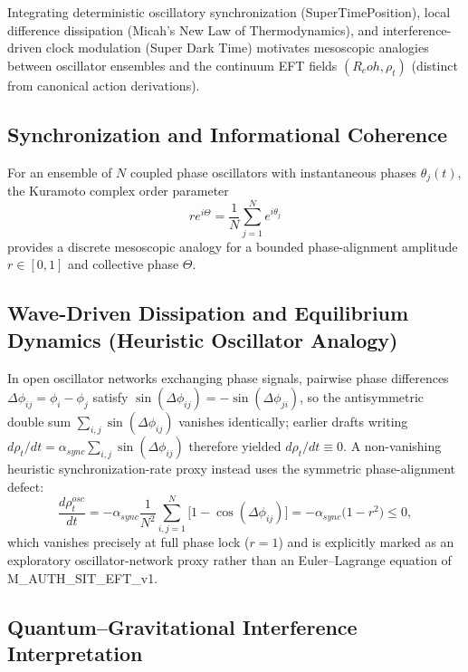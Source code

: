 \documentclass[american,11pt,letterpaper]{article}
\newcommand{\Rcoh}{R_{\mathrm{coh}}}
\def\mathrm#1{#1}%
\def\texttt#1{#1}%
\def\emph#1{#1}%
\def\Rcoh{R_coh}%
\begin{document}
Integrating deterministic oscillatory synchronization (\emph{SuperTimePosition}), local difference dissipation (\emph{Micah's New Law of Thermodynamics}), and interference-driven clock modulation (\emph{Super Dark Time}) motivates mesoscopic analogies between oscillator ensembles and the continuum EFT fields $(\Rcoh, \rho_t)$ (distinct from canonical action derivations).

\subsection{Synchronization and Informational Coherence}

For an ensemble of $N$ coupled phase oscillators with instantaneous phases $\theta_j(t)$, the Kuramoto complex order parameter
\begin{equation}
r e^{i\Theta} = \frac{1}{N}\sum_{j=1}^N e^{i\theta_j}
\label{eq:kuramoto_order_sec4}
\end{equation}
provides a discrete mesoscopic analogy for a bounded phase-alignment amplitude $r \in [0,1]$ and collective phase $\Theta$.

\subsection{Wave-Driven Dissipation and Equilibrium Dynamics (Heuristic Oscillator Analogy)}

In open oscillator networks exchanging phase signals, pairwise phase differences $\Delta\phi_{ij} = \phi_i - \phi_j$ satisfy $\sin(\Delta\phi_{ij}) = -\sin(\Delta\phi_{ji})$, so the antisymmetric double sum $\sum_{i,j}\sin(\Delta\phi_{ij})$ vanishes identically; earlier drafts writing $d\rho_t/dt = \alpha_{\mathrm{sync}}\sum_{i,j}\sin(\Delta\phi_{ij})$ therefore yielded $d\rho_t/dt \equiv 0$. A non-vanishing heuristic synchronization-rate proxy instead uses the symmetric phase-alignment defect:
\begin{equation}
\frac{d\rho_t^{\mathrm{osc}}}{dt} = -\alpha_{\mathrm{sync}}\frac{1}{N^2}\sum_{i,j=1}^N \bigl[1 - \cos(\Delta\phi_{ij})\bigr] = -\alpha_{\mathrm{sync}}\bigl(1 - r^2\bigr) \le 0,
\end{equation}
which vanishes precisely at full phase lock ($r = 1$) and is explicitly marked as an exploratory oscillator-network proxy rather than an Euler--Lagrange equation of \texttt{M\_AUTH\_SIT\_EFT\_v1}.

\subsection{Quantum--Gravitational Interference Interpretation}
\end{document}
